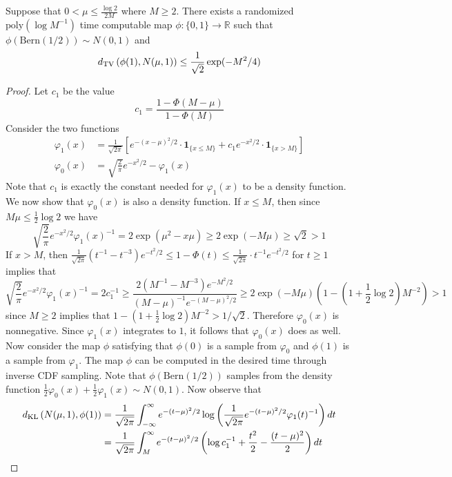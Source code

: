 \documentclass[11pt]{article}
\begin{document}
\begin{lemma}
Suppose that $0 < \mu \le \frac{\log 2}{2M}$ where $M \ge 2$. There exists a randomized $\text{poly}(\log M^{-1})$ time computable map $\phi : \{0, 1\} \to \mathbb{R}$ such that $\phi(\text{Bern}(1/2)) \sim N(0, 1)$ and
$$d_{\text{TV}}\left(\phi(1), N(\mu, 1) \right) \le \frac{1}{\sqrt{2}} \exp(-M^2/4)$$
\end{lemma}

\begin{proof}
Let $c_1$ be the value
$$c_1 = \frac{1 - \Phi(M - \mu)}{1 - \Phi(M)}$$
Consider the two functions
\begin{align*}
\varphi_1(x) &= \frac{1}{\sqrt{2\pi}} \left[ e^{-(x - \mu)^2/2} \cdot \mathbf{1}_{\{x \le M\}} + c_1 e^{-x^2/2} \cdot \mathbf{1}_{\{x > M\}} \right] \\
\varphi_0(x) &= \sqrt{\frac{2}{\pi}} e^{-x^2/2} - \varphi_1(x)
\end{align*}
Note that $c_1$ is exactly the constant needed for $\varphi_1(x)$ to be a density function. We now show that $\varphi_0(x)$ is also a density function. If $x \le M$, then since $M \mu \le \frac{1}{2} \log 2$ we have
$$\sqrt{\frac{2}{\pi}} e^{-x^2/2} \varphi_1(x)^{-1} = 2 \exp\left( \mu^2 - x \mu \right) \ge 2 \exp \left( -M \mu \right) \ge \sqrt{2} > 1$$
If $x > M$, then $\frac{1}{\sqrt{2\pi}}(t^{-1} - t^{-3}) e^{-t^2/2} \le 1 - \Phi(t) \le \frac{1}{\sqrt{2\pi}} \cdot t^{-1} e^{-t^2/2}$ for $t \ge 1$ implies that
$$\sqrt{\frac{2}{\pi}} e^{-x^2/2} \varphi_1(x)^{-1} = 2 c_1^{-1} \ge \frac{2(M^{-1} - M^{-3})e^{-M^2/2}}{(M - \mu)^{-1} e^{-(M - \mu)^2/2}} \ge  2 \exp \left( -M \mu \right) \left( 1 - \left(1 + \frac{1}{2} \log 2 \right) M^{-2} \right) > 1$$
since $M \ge 2$ implies that $1 - \left(1 + \frac{1}{2} \log 2 \right) M^{-2} > 1/\sqrt{2}$. Therefore $\varphi_0(x)$ is nonnegative. Since $\varphi_1(x)$ integrates to $1$, it follows that $\varphi_0(x)$ does as well. Now consider the map $\phi$ satisfying that $\phi(0)$ is a sample from $\varphi_0$ and $\phi(1)$ is a sample from $\varphi_1$. The map $\phi$ can be computed in the desired time through inverse CDF sampling. Note that $\phi(\text{Bern}(1/2))$ samples from the density function $\frac{1}{2} \varphi_0(x) + \frac{1}{2} \varphi_1(x) \sim N(0, 1)$. Now observe that
\begin{align*}
\KL\left(N(\mu, 1), \phi(1) \right) &= \frac{1}{\sqrt{2\pi}} \int_{-\infty}^\infty e^{-(t - \mu)^2/2} \log \left( \frac{1}{\sqrt{2\pi}} e^{-(t - \mu)^2/2}\varphi_1(t)^{-1} \right) dt \\
&= \frac{1}{\sqrt{2\pi}} \int_{M}^\infty e^{-(t - \mu)^2/2} \left( \log c_1^{-1} + \frac{t^2}{2} - \frac{(t - \mu)^2}{2} \right) dt \\

\end{align*}
\end{proof}
\end{document}
